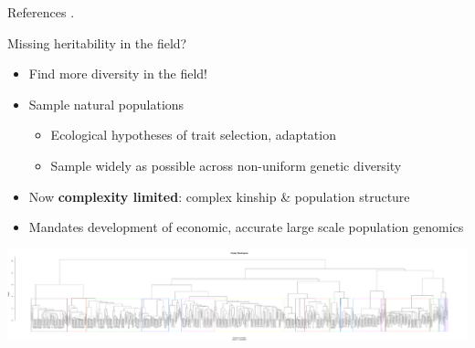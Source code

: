 \documentclass[t]{beamer}
\begin{document}
\begin{frame}[shrink=20]{References}
  \printbibliography
  \vfill
  .
\end{frame}


\begin{frame}{Missing heritability in the field?}
  \begin{itemize}
    \item Find more diversity in the field!
    \item Sample natural populations
      \begin{itemize}
        \item Ecological hypotheses of trait selection, adaptation
        \item Sample widely as possible across non-uniform genetic diversity
      \end{itemize}
      \pause
    \item Now \textbf{complexity limited}: complex kinship \& population
      structure
    \item Mandates development of economic, accurate large scale population
      genomics
  \end{itemize}
  \begin{center}
    \includegraphics[width=\textwidth]{img/jared-tree.pdf}
  \end{center}
\end{frame}
\end{document}
